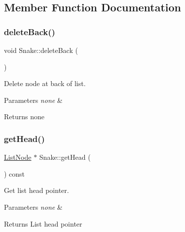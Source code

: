 \subsection{Member Function Documentation}
\mbox{\label{class_snake_aef36368de7f3f811d424e3ae02f2393d}} 
\subsubsection{\texorpdfstring{delete\+Back()}{deleteBack()}}
{\footnotesize\ttfamily void Snake\+::delete\+Back (\begin{DoxyParamCaption}{ }\end{DoxyParamCaption})}



Delete node at back of list. 


\begin{DoxyParams}{Parameters}
{\em none} & \\
\hline
\end{DoxyParams}
\begin{DoxyReturn}{Returns}
none 
\end{DoxyReturn}
\mbox{\label{class_snake_a69f6fbdc2ef89a8d8881dbfdbca2260f}} 
\subsubsection{\texorpdfstring{get\+Head()}{getHead()}}
{\footnotesize\ttfamily \hyperlink{class_list_node}{List\+Node} $\ast$ Snake\+::get\+Head (\begin{DoxyParamCaption}{ }\end{DoxyParamCaption}) const}



Get list head pointer. 


\begin{DoxyParams}{Parameters}
{\em none} & \\
\hline
\end{DoxyParams}
\begin{DoxyReturn}{Returns}
List head pointer 
\end{DoxyReturn}
\mbox{\label{class_snake_ae70820c279a79caae3dcfe4cbaa4b747}} 
